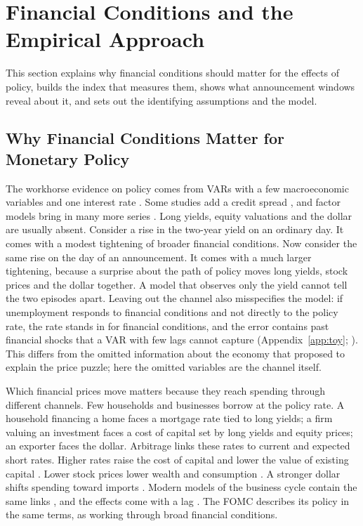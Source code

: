 \documentclass[11pt]{article}
\begin{document}
\FloatBarrier
\section{Financial Conditions and the Empirical Approach}\label{sec:data}
This section explains why financial conditions should matter for the effects of policy, builds the index that measures them, shows what announcement windows reveal about it, and sets out the identifying assumptions and the model.

\subsection{Why Financial Conditions Matter for Monetary Policy}\label{sec:background}
The workhorse evidence on policy comes from VARs with a few macroeconomic variables and one interest rate \citep{bernanke1992,christiano1999}. Some studies add a credit spread \citep{gertler2015,caldara2019}, and factor models bring in many more series \citep{bernanke2005favar}. Long yields, equity valuations and the dollar are usually absent. Consider a rise in the two-year yield on an ordinary day. It comes with a modest tightening of broader financial conditions. Now consider the same rise on the day of an announcement. It comes with a much larger tightening, because a surprise about the path of policy moves long yields, stock prices and the dollar together. A model that observes only the yield cannot tell the two episodes apart. Leaving out the channel also misspecifies the model: if unemployment responds to financial conditions and not directly to the policy rate, the rate stands in for financial conditions, and the error contains past financial shocks that a VAR with few lags cannot capture (Appendix~\ref{app:toy}; \citealp{fernandez2007}). This differs from the omitted information about the economy that \citet{sims1992} proposed to explain the price puzzle; here the omitted variables are the channel itself.

Which financial prices move matters because they reach spending through different channels. Few households and businesses borrow at the policy rate. A household financing a home faces a mortgage rate tied to long yields; a firm valuing an investment faces a cost of capital set by long yields and equity prices; an exporter faces the dollar. Arbitrage links these rates to current and expected short rates. Higher rates raise the cost of capital and lower the value of existing capital \citep{jorgenson1963,hall1967,tobin1969}. Lower stock prices lower wealth and consumption \citep{ando1963,friedman1957}. A stronger dollar shifts spending toward imports \citep{fleming1962,mundell1963}. Modern models of the business cycle contain the same links \citep{christiano2005,smets2007,gali2005,kaplan2018,auclert2019}, and the effects come with a lag \citep{friedman1961}. The FOMC describes its policy in the same terms, as working through broad financial conditions.
\end{document}
